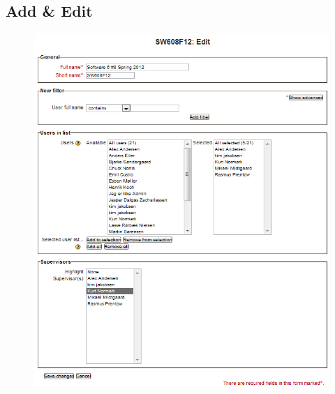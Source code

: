 \subsection{Add \& Edit}

\begin{figure}
	\centering
		\includegraphics[width=\textwidth]{images/moodleprojecgroupedit.png}
	\label{fig:moodleprojecgroupedit}
\end{figure}
